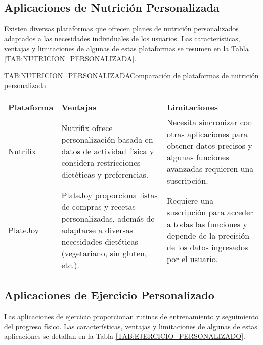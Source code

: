 \subsection{Aplicaciones de Nutrición Personalizada}

Existen diversas plataformas que ofrecen planes de nutrición personalizados adaptados a las necesidades individuales de los usuarios. Las características, ventajas y limitaciones de algunas de estas plataformas se resumen en la Tabla \ref{TAB:NUTRICION_PERSONALIZADA}.

\begin{table}[Plataformas de Nutrición Personalizada]{TAB:NUTRICION_PERSONALIZADA}{Comparación de plataformas de nutrición personalizada}
  \begin{tabular}{|p{3cm}|p{5cm}|p{5cm}|}
    \hline
    \textbf{Plataforma} & \textbf{Ventajas} & \textbf{Limitaciones} \\
    \hline
    Nutrifix & Nutrifix ofrece personalización basada en datos de actividad física y considera restricciones dietéticas y preferencias. & Necesita sincronizar con otras aplicaciones para obtener datos precisos y algunas funciones avanzadas requieren una suscripción. \\
    \hline
    PlateJoy & PlateJoy proporciona listas de compras y recetas personalizadas, además de adaptarse a diversas necesidades dietéticas (vegetariano, sin gluten, etc.). & Requiere una suscripción para acceder a todas las funciones y depende de la precisión de los datos ingresados por el usuario. \\
    \hline
  \end{tabular}
\end{table}

\subsection{Aplicaciones de Ejercicio Personalizado}

Las aplicaciones de ejercicio proporcionan rutinas de entrenamiento y seguimiento del progreso físico. Las características, ventajas y limitaciones de algunas de estas aplicaciones se detallan en la Tabla \ref{TAB:EJERCICIO_PERSONALIZADO}.

